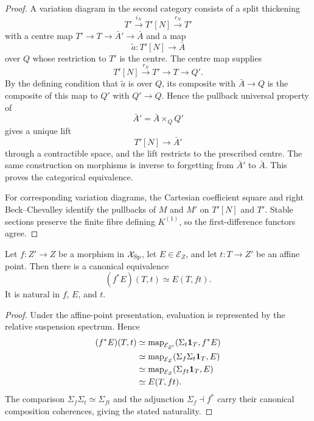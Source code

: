 \begin{proof}
A variation diagram in the second category consists of a split thickening
\[
    T'\xrightarrow{i_N}T'[N]\xrightarrow{r_N}T'
\]
with a centre map \(T'\to T\to\bar A'\to\bar A\) and a map
\[
    \widetilde a:T'[N]\longrightarrow\bar A
\]
over \(Q\) whose restriction to \(T'\) is the centre. The centre map supplies
\[
    T'[N]\xrightarrow{r_N}T'\longrightarrow T\longrightarrow Q'.
\]
By the defining condition that \(\widetilde a\) is over \(Q\), its composite with \(\bar A\to Q\) is the composite of this map to \(Q'\) with \(Q'\to Q\). Hence the pullback universal property of
\[
    \bar A'=\bar A\times_QQ'
\]
gives a unique lift
\[
    T'[N]\longrightarrow\bar A'
\]
through a contractible space, and the lift restricts to the prescribed centre. The same construction on morphisms is inverse to forgetting from \(\bar A'\) to \(\bar A\). This proves the categorical equivalence.

For corresponding variation diagrams, the Cartesian coefficient square and right Beck--Chevalley identify the pullbacks of \(M\) and \(M'\) on \(T'[N]\) and \(T'\). Stable sections preserve the finite fibre defining \(K^{(1)}\), so the first-difference functors agree.
\end{proof}


\begin{lemma}
\label{lem:var-affine-point-pullback}
Let \(f:Z'\to Z\) be a morphism in \(\mathcal{X}_{\mathrm{Sp}}\), let \(E\in\mathcal E_Z\), and let \(t:T\to Z'\) be an affine point. Then there is a canonical equivalence
\[
    \boxed{
    (f^*E)(T,t)
    \simeq
    E(T,ft).
    }
\]
It is natural in \(f\), \(E\), and \(t\).
\end{lemma}

\begin{proof}
Under the affine-point presentation, evaluation is represented by the relative suspension spectrum. Hence
\[
\begin{aligned}
    (f^*E)(T,t)
    &\simeq
    \operatorname{map}_{\mathcal E_{Z'}}
    (\Sigma_t\mathbf 1_T,f^*E)
    \\
    &\simeq
    \operatorname{map}_{\mathcal E_Z}
    (\Sigma_f\Sigma_t\mathbf 1_T,E)
    \\
    &\simeq
    \operatorname{map}_{\mathcal E_Z}
    (\Sigma_{ft}\mathbf 1_T,E)
    \\
    &\simeq
    E(T,ft).
\end{aligned}
\]
The comparison \(\Sigma_f\Sigma_t\simeq\Sigma_{ft}\) and the adjunction
\(\Sigma_f\dashv f^*\) carry their canonical composition coherences, giving the stated naturality.
\end{proof}

